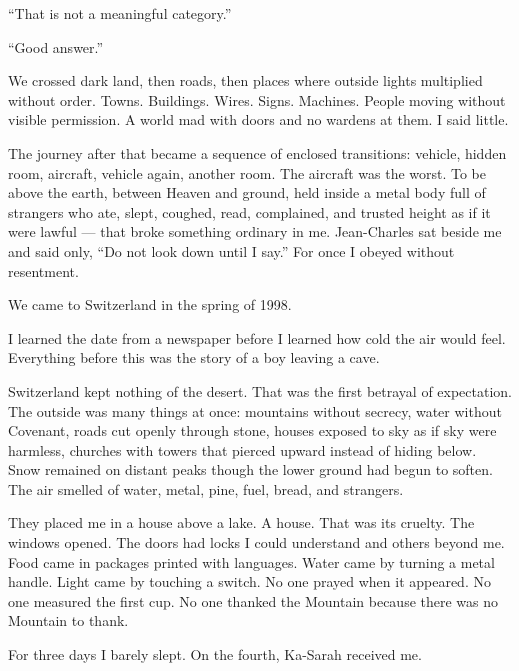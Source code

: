``That is not a meaningful category.''\par

``Good answer.''\par

We crossed dark land, then roads, then places where outside lights multiplied without order. Towns. Buildings. Wires. Signs. Machines. People moving without visible permission. A world mad with doors and no wardens at them. I said little.\par

The journey after that became a sequence of enclosed transitions: vehicle, hidden room, aircraft, vehicle again, another room. The aircraft was the worst. To be above the earth, between Heaven and ground, held inside a metal body full of strangers who ate, slept, coughed, read, complained, and trusted height as if it were lawful --- that broke something ordinary in me. Jean-Charles sat beside me and said only, ``Do not look down until I say.'' For once I obeyed without resentment.\par

We came to Switzerland in the spring of 1998.\par

I learned the date from a newspaper before I learned how cold the air would feel. Everything before this was the story of a boy leaving a cave.\par

Switzerland kept nothing of the desert. That was the first betrayal of expectation. The outside was many things at once: mountains without secrecy, water without Covenant, roads cut openly through stone, houses exposed to sky as if sky were harmless, churches with towers that pierced upward instead of hiding below. Snow remained on distant peaks though the lower ground had begun to soften. The air smelled of water, metal, pine, fuel, bread, and strangers.\par

They placed me in a house above a lake. A house. That was its cruelty. The windows opened. The doors had locks I could understand and others beyond me. Food came in packages printed with languages. Water came by turning a metal handle. Light came by touching a switch. No one prayed when it appeared. No one measured the first cup. No one thanked the Mountain because there was no Mountain to thank.\par

For three days I barely slept. On the fourth, Ka-Sarah received me.\par

